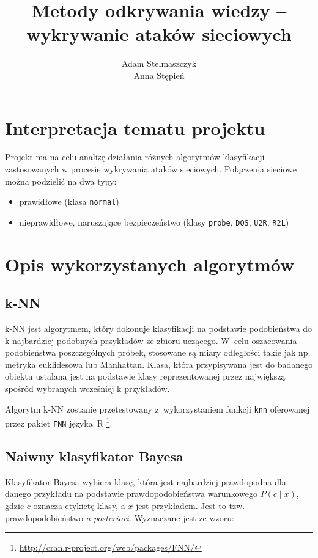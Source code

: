 \documentclass[a4paper, 12pt]{article}
\title{Metody odkrywania wiedzy -- wykrywanie ataków sieciowych}
\author{Adam Stelmaszczyk\\ Anna Stępień}
\begin{document}
\maketitle

\tableofcontents

\newpage

\section{Interpretacja tematu projektu}
Projekt ma na celu analizę działania różnych algorytmów klasyfikacji zastosowanych
w procesie wykrywania ataków sieciowych. Połączenia sieciowe można podzielić na dwa typy:
\begin{itemize}
	\item prawidłowe (klasa \texttt{normal})
	\item nieprawidłowe, naruszające bezpieczeństwo
(klasy \texttt{probe}, \texttt{DOS}, \texttt{U2R}, \texttt{R2L})
\end{itemize} 

\section{Opis wykorzystanych algorytmów}\label{algorithms}

\subsection{k-NN}
k-NN jest algorytmem, który dokonuje klasyfikacji na podstawie podobieństwa do k 
najbardziej podobnych przykładów ze zbioru uczącego. W~celu oszacowania podobieństwa 
poszczególnych próbek, stosowane są miary odległości takie jak np. metryka euklidesowa lub Manhattan. 
Klasa, która przypisywana jest do badanego obiektu ustalana jest na podstawie klasy 
reprezentowanej przez największą spośród wybranych wcześniej k przykładów.

Algorytm k-NN zostanie przetestowany z~wykorzystaniem funkcji 
\texttt{knn} oferowanej przez pakiet \texttt{FNN} języka~R 
\footnote{\url{http://cran.r-project.org/web/packages/FNN/}}.

\subsection{Naiwny klasyfikator Bayesa}

Klasyfikator Bayesa wybiera klasę, która jest najbardziej prawdopodna dla danego przykładu na 
podstawie prawdopodobieństwa
warunkowego $P(c \mid x)$, gdzie $c$ oznacza etykietę klasy, a $x$ jest przykładem. 
Jest to tzw. prawdopodobieństwo
\textit{a posteriori}. Wyznaczane jest ze wzoru:
\end{document}
